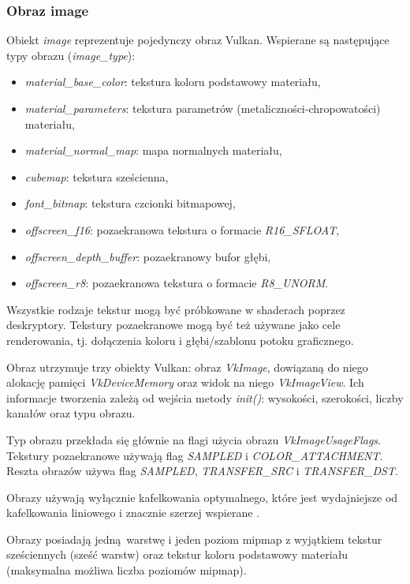 \subsubsection{Obraz image}
Obiekt \textit{image} reprezentuje pojedynczy obraz Vulkan.
Wspierane są następujące typy obrazu (\textit{image\_type}):
\begin{itemize}
	\item \textit{material\_base\_color}: tekstura koloru podstawowy materiału,
	\item \textit{material\_parameters}: tekstura parametrów (metaliczności-chropowatości) materiału,
	\item \textit{material\_normal\_map}: mapa normalnych materiału,
	\item \textit{cubemap}: tekstura sześcienna,
	\item \textit{font\_bitmap}: tekstura czcionki bitmapowej,
	\item \textit{offscreen\_f16}: pozaekranowa tekstura o formacie \textit{R16\_SFLOAT},
	\item \textit{offscreen\_depth\_buffer}: pozaekranowy bufor głębi,
	\item \textit{offscreen\_r8}: pozaekranowa tekstura o formacie \textit{R8\_UNORM}.
\end{itemize}

Wszystkie rodzaje tekstur mogą być próbkowane w shaderach poprzez deskryptory.
Tekstury pozaekranowe mogą być też używane jako cele renderowania, tj. dołączenia koloru i głębi/szablonu potoku graficznego.

Obraz utrzymuje trzy obiekty Vulkan: obraz \textit{VkImage}, dowiązaną do niego alokację pamięci \textit{VkDeviceMemory} oraz widok na niego \textit{VkImageView}.
Ich informacje tworzenia zależą od wejścia metody \textit{init()}: wysokości, szerokości, liczby kanałów oraz typu obrazu.

Typ obrazu przekłada się głównie na flagi użycia obrazu \textit{VkImageUsageFlags}.
Tekstury pozaekranowe używają flag \textit{SAMPLED} i \textit{COLOR\_ATTACHMENT}.
Reszta obrazów używa flag \textit{SAMPLED}, \textit{TRANSFER\_SRC} i \textit{TRANSFER\_DST}.

Obrazy używają wyłącznie kafelkowania optymalnego, które jest wydajniejsze od kafelkowania liniowego i znacznie szerzej wspierane \cite{GPUINFO}.

Obrazy posiadają jedną warstwę i jeden poziom mipmap z wyjątkiem tekstur sześciennych (sześć warstw) oraz tekstur koloru podstawowy materiału (maksymalna możliwa liczba poziomów mipmap).

